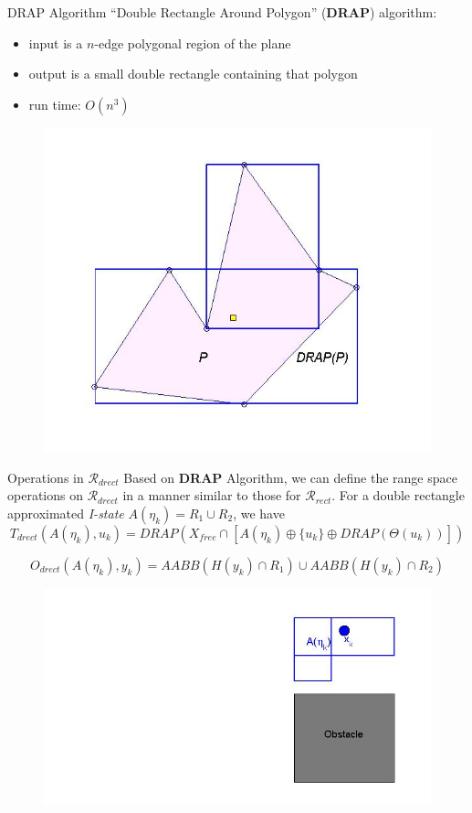 \begin{frame}{DRAP Algorithm}
  ``Double Rectangle Around Polygon'' (\textbf{DRAP}) algorithm:\\
  \begin{itemize}
  \item input is a $n$-edge polygonal region of the plane
  \item output is a small double rectangle containing that polygon
  \item run time: $O(n^3)$
  \end{itemize}
  \begin{figure}
    \includegraphics[scale=0.3]{figs/drap.jpg}
  \end{figure}
\end{frame}


\begin{frame}{Operations in $\mathcal{R}_{drect}$}
  Based on \textbf{DRAP} Algorithm, we can define the range space operations on
  $\mathcal{R}_{drect}$ in a manner similar to those for $\mathcal{R}_{rect}$.
  For a double rectangle approximated \emph{I-state} $A(\eta_k) = R_1 \cup R_2$,
  we have
 $$ T_{drect}(A(\eta_k), u_k) = DRAP(X_{free} \cap [A(\eta_k) \oplus \{ u_k \} \oplus DRAP(\Theta(u_k))])$$

  $$O_{drect}(A(\eta_k), y_k) = AABB(H(y_k) \cap R_1)\cup AABB(H(y_k) \cap R_2)$$
  \begin{figure}
    \includegraphics[scale=0.3]{figs/drectevolve0.jpg}
  \end{figure}
\end{frame}

